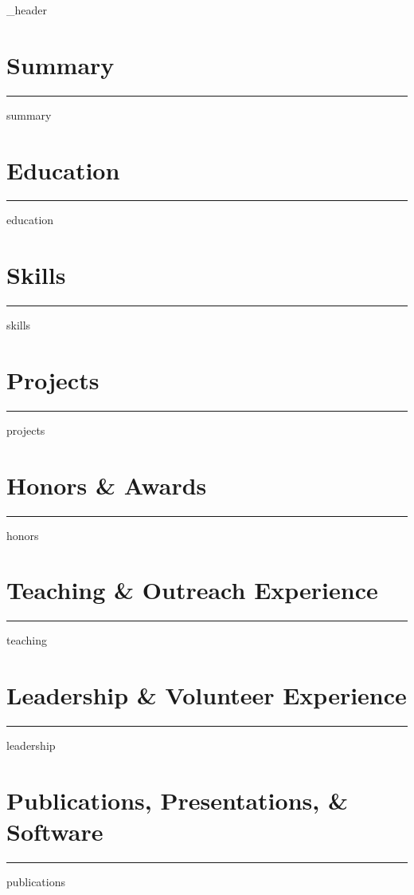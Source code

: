 \documentclass[letter,11pt]{article}
\author{Noah R. Franz}
\begin{document}
 

{_header}

\section{Summary}
\vspace*{5pt}
\hrule
\vspace*{5pt}
{summary}
\vspace*{5pt}

\section{Education}
\vspace*{5pt}
\hrule
\vspace*{5pt}
{education}
\vspace*{5pt}

\section{Skills}
\vspace*{5pt}
\hrule
\vspace*{5pt}
{skills}
\vspace*{5pt}

\section{Projects}
\vspace*{5pt}
\hrule
\vspace*{5pt}
{projects}
\vspace*{5pt}

\section{Honors \& Awards}
\vspace*{5pt}
\hrule
\vspace*{5pt}
{honors}
\vspace*{5pt}

\section{Teaching \& Outreach Experience}
\vspace*{5pt}
\hrule
\vspace*{5pt}
{teaching}
\vspace*{5pt}

\section{Leadership \& Volunteer  Experience}
\vspace*{5pt}
\hrule
\vspace*{5pt}
{leadership}
\vspace*{5pt}

\section{Publications, Presentations, \& Software}
\vspace*{5pt}
\hrule
\vspace*{5pt}
{publications}
\vspace*{5pt}
\end{document}
